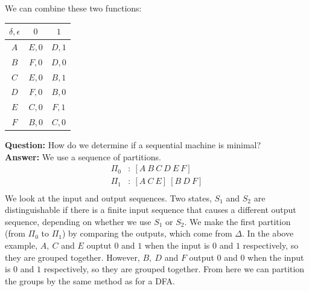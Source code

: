 \documentclass{scrartcl}
\begin{document}
We can combine these two functions:\\
\begin{center}
\begin{tabular} {|c|c c|}
\hline
$\delta,\epsilon$&$0$&$1$\\
\hline
$A$ & $E,0$ & $D,1$\\
$B$ & $F,0$ & $D,0$\\
$C$ & $E,0$ & $B,1$\\
$D$ & $F,0$ & $B,0$\\
$E$ & $C,0$ & $F,1$\\
$F$ & $B,0$ & $C,0$\\
\hline
\end{tabular}
\end{center}

\textbf{Question: } How do we determine if a sequential machine is minimal?\\

\textbf{Answer: } We use a sequence of partitions.
\begin{align*}
\Pi_0&:\ [A\ B\ C\ D\ E\ F]\\
\Pi_1&:\ [A\ C\ E]\ [B\ D\ F]\\
\end{align*}
We look at the input and output sequences. Two states, $S_1$ and $S_2$ are distinguishable if there is a finite input sequence that causes a different output sequence, depending on whether we use $S_1$ or $S_2$. We make the first partition (from $\Pi_0$ to $\Pi_1$) by comparing the outputs, which come from $\Delta$. In the above example, $A,\ C$ and $E$ ouptut $0$ and $1$ when the input is $0$ and $1$ respectively, so they are grouped together. However, $B,\ D$ and $F$ output $0$ and $0$ when the input is $0$ and $1$ respectively, so they are grouped together. From here we can partition the groups by the same method as for a DFA.
\end{document}
